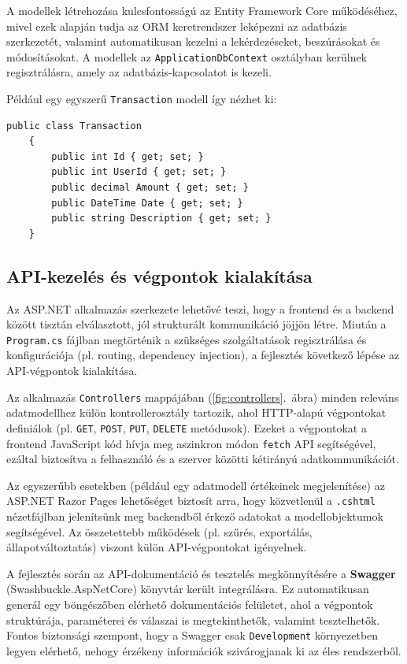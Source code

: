 A modellek létrehozása kulcsfontosságú az Entity Framework Core működéséhez, mivel ezek alapján tudja az ORM keretrendszer leképezni az adatbázis szerkezetét, valamint automatikusan kezelni a lekérdezéseket, beszúrásokat és módosításokat. A modellek az \texttt{ApplicationDbContext} osztályban kerülnek regisztrálásra, amely az adatbázis-kapcsolatot is kezeli.

Például egy egyszerű \texttt{Transaction} modell így nézhet ki:

\begin{lstlisting}[language={[Sharp]C}, caption={Egyszerű modell osztály példa}]
	public class Transaction
	{
		public int Id { get; set; }
		public int UserId { get; set; }
		public decimal Amount { get; set; }
		public DateTime Date { get; set; }
		public string Description { get; set; }
	}
\end{lstlisting}


\subsection{API-kezelés és végpontok kialakítása}

Az ASP.NET alkalmazás szerkezete lehetővé teszi, hogy a frontend és a backend között tisztán elválasztott, jól strukturált kommunikáció jöjjön létre. Miután a \texttt{Program.cs} fájlban megtörténik a szükséges szolgáltatások regisztrálása és konfigurációja (pl. routing, dependency injection), a fejlesztés következő lépése az API-végpontok kialakítása.

Az alkalmazás \texttt{Controllers} mappájában (\ref{fig:controllers}.~ábra) minden releváns adatmodellhez külön kontrollerosztály tartozik, ahol HTTP-alapú végpontokat definiálok (pl. \texttt{GET}, \texttt{POST}, \texttt{PUT}, \texttt{DELETE} metódusok). Ezeket a végpontokat a frontend JavaScript kód hívja meg aszinkron módon \texttt{fetch} API segítségével, ezáltal biztosítva a felhasználó és a szerver közötti kétirányú adatkommunikációt.

Az egyszerűbb esetekben (például egy adatmodell értékeinek megjelenítése) az ASP.NET Razor Pages lehetőséget biztosít arra, hogy közvetlenül a \texttt{.cshtml} nézetfájlban jelenítsünk meg backendből érkező adatokat a modellobjektumok segítségével. Az összetettebb működések (pl. szűrés, exportálás, állapotváltoztatás) viszont külön API-végpontokat igényelnek.

A fejlesztés során az API-dokumentáció és tesztelés megkönnyítésére a \textbf{Swagger} (Swashbuckle.AspNetCore) könyvtár került integrálásra. Ez automatikusan generál egy böngészőben elérhető dokumentációs felületet, ahol a végpontok struktúrája, paraméterei és válaszai is megtekinthetők, valamint tesztelhetők. Fontos biztonsági szempont, hogy a Swagger csak \texttt{Development} környezetben legyen elérhető, nehogy érzékeny információk szivárogjanak ki az éles rendszerből.

